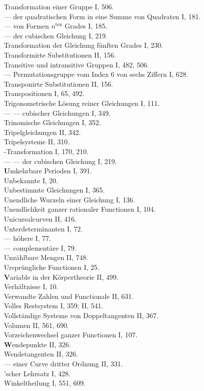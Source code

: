 \begin{flushleft}
Transformation einer Gruppe I, 506. \\
— der quadratischen Form in eine Summe von Quadraten I, 181. \\
— von Formen $n^{\text{ten}}$ Grades I, 185. \\
— der cubischen Gleichung I, 219. \\
Transformation der Gleichung f\"unften Grades I, 230. \\
Transformirte Substitutionen II, 156. \\
Transitive und intransitive Gruppen I, 482, 506. \\
— Permutationsgruppe vom Index 6 von sechs Ziffern I, 628. \\
Transponirte Substitutionen II, 156. \\
Transpositionen I, 65, 492. \\
Trigonometrische L\"osung reiner Gleichungen I, 111. \\
— — cubischer Gleichungen I, 349. \\
Trinomische Gleichungen I, 352. \\
Tripelgleichungen II, 342. \\
Tripelsysteme II, 310. \\
-Transformation I, 170, 210. \\
— — der cubischen Gleichung I, 219. \\[6pt]
\textbf{U}mkehrbare Perioden I, 391. \\
Unbekannte I, 20. \\
Unbestimmte Gleichungen I, 365. \\
Unendliche Wurzeln einer Gleichung I, 136. \\
Unendlichkeit ganzer rationaler Functionen I, 104. \\
Unicursalcurven II, 416. \\
Unterdeterminanten I, 72. \\
— h\"ohere I, 77. \\
— complement\"are I, 79. \\
Unz\"ahlbare Mengen II, 748. \\
Urspr\"ungliche Functionen I, 25. \\[6pt]
\textbf{V}ariable in der K\"orpertheorie II, 499. \\
Verh\"altnisse I, 10. \\
Verwandte Zahlen und Functionale II, 631. \\
Volles Restsystem I, 359; II, 541. \\
Vollst\"andige Systeme von Doppeltangenten II, 367. \\
Volumen II, 561, 690. \\
Vorzeichenwechsel ganzer Functionen I, 107. \\[6pt]
\textbf{W}endepunkte II, 326. \\
Wendetangenten II, 326. \\
— einer Curve dritter Ordnung II, 331. \\
'scher Lehrsatz I, 428. \\
Winkeltheilung I, 551, 609.
\end{flushleft}
